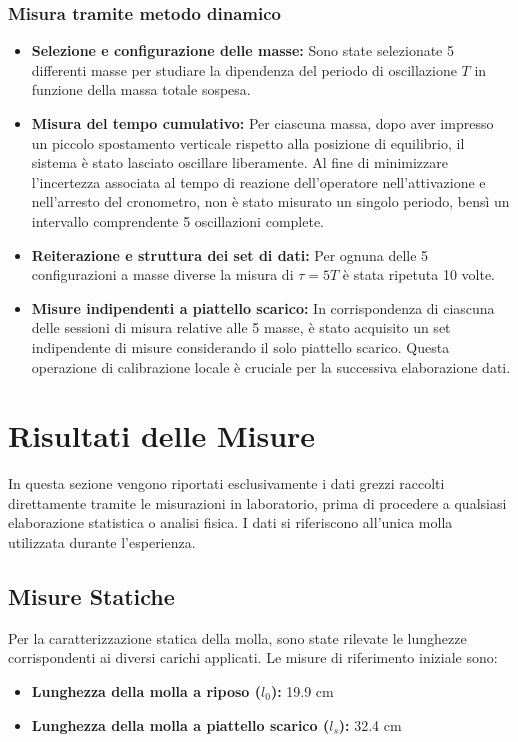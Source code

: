 \documentclass[a4paper,12pt]{article}
\begin{document}
\subsubsection{Misura tramite metodo dinamico}
\begin{itemize}
    \item \textbf{Selezione e configurazione delle masse:} Sono state selezionate 5 differenti masse per studiare la dipendenza del periodo di oscillazione $T$ in funzione della massa totale sospesa.
    
    \item \textbf{Misura del tempo cumulativo:} Per ciascuna massa, dopo aver impresso un piccolo spostamento verticale rispetto alla posizione di equilibrio, il sistema è stato lasciato oscillare liberamente. Al fine di minimizzare l'incertezza associata al tempo di reazione dell'operatore nell'attivazione e nell'arresto del cronometro, non è stato misurato un singolo periodo, bensì un intervallo comprendente 5 oscillazioni complete.
    
    \item \textbf{Reiterazione e struttura dei set di dati:} Per ognuna delle 5 configurazioni a masse diverse la misura di $\tau = 5T$ è stata ripetuta 10 volte.
    
    \item \textbf{Misure indipendenti a piattello scarico:} In corrispondenza di ciascuna delle sessioni di misura relative alle 5 masse, è stato acquisito un set indipendente di misure considerando il solo piattello scarico. Questa operazione di calibrazione locale è cruciale per la successiva elaborazione dati.
\end{itemize}

\section{Risultati delle Misure}

In questa sezione vengono riportati esclusivamente i dati grezzi raccolti direttamente tramite le misurazioni in laboratorio, prima di procedere a qualsiasi elaborazione statistica o analisi fisica. I dati si riferiscono all'unica molla utilizzata durante l'esperienza.

\subsection{Misure Statiche}
Per la caratterizzazione statica della molla, sono state rilevate le lunghezze corrispondenti ai diversi carichi applicati. Le misure di riferimento iniziale sono:
\begin{itemize}
    \item \textbf{Lunghezza della molla a riposo ($l_0$):} 19.9 cm
    \item \textbf{Lunghezza della molla a piattello scarico ($l_s$):} 32.4 cm
\end{itemize}
\end{document}
